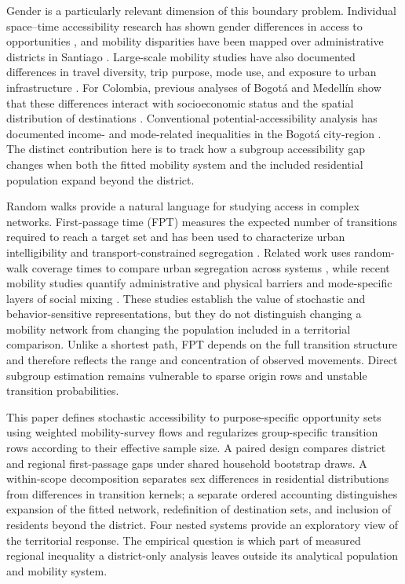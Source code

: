 \documentclass[11pt]{article}
\begin{document}
Gender is a particularly relevant dimension of this boundary problem. Individual space--time accessibility research has shown gender differences in access to opportunities \citep{kwan1999}, and mobility disparities have been mapped over administrative districts in Santiago \citep{gauvin2020}. Large-scale mobility studies have also documented differences in travel diversity, trip purpose, mode use, and exposure to urban infrastructure \citep{macedo2020,macedo2022,battiston2023}. For Colombia, previous analyses of Bogotá and Medellín show that these differences interact with socioeconomic status and the spatial distribution of destinations \citep{macedo2022}. Conventional potential-accessibility analysis has documented income- and mode-related inequalities in the Bogotá city-region \citep{guzman2017}. The distinct contribution here is to track how a subgroup accessibility gap changes when both the fitted mobility system and the included residential population expand beyond the district.

Random walks provide a natural language for studying access in complex networks. First-passage time (FPT) measures the expected number of transitions required to reach a target set \citep{noh2004} and has been used to characterize urban intelligibility and transport-constrained segregation \citep{blanchard2008,neira2024}. Related work uses random-walk coverage times to compare urban segregation across systems \citep{sousa2022}, while recent mobility studies quantify administrative and physical barriers \citep{pinter2025} and mode-specific layers of social mixing \citep{yang2026}. These studies establish the value of stochastic and behavior-sensitive representations, but they do not distinguish changing a mobility network from changing the population included in a territorial comparison. Unlike a shortest path, FPT depends on the full transition structure and therefore reflects the range and concentration of observed movements. Direct subgroup estimation remains vulnerable to sparse origin rows and unstable transition probabilities.

This paper defines stochastic accessibility to purpose-specific opportunity sets using weighted mobility-survey flows and regularizes group-specific transition rows according to their effective sample size. A paired design compares district and regional first-passage gaps under shared household bootstrap draws. A within-scope decomposition separates sex differences in residential distributions from differences in transition kernels; a separate ordered accounting distinguishes expansion of the fitted network, redefinition of destination sets, and inclusion of residents beyond the district. Four nested systems provide an exploratory view of the territorial response. The empirical question is which part of measured regional inequality a district-only analysis leaves outside its analytical population and mobility system.
\end{document}
